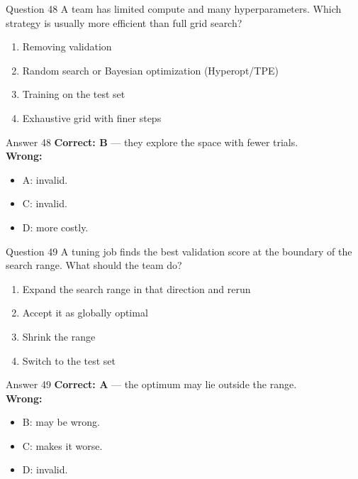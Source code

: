 \documentclass[aspectratio=169,11pt]{beamer}
\begin{document}
\begin{frame}{Question 48}
A team has limited compute and many hyperparameters. Which strategy is usually more efficient than full grid search?
\begin{enumerate}[label=\Alph*.]
\item Removing validation
\item Random search or Bayesian optimization (Hyperopt/TPE)
\item Training on the test set
\item Exhaustive grid with finer steps
\end{enumerate}
\end{frame}
\begin{frame}{Answer 48}
\textbf{Correct: B} --- they explore the space with fewer trials.\\
\vspace{0.5em}
\textbf{Wrong:}
\begin{itemize}
\item A: invalid.
\item C: invalid.
\item D: more costly.
\end{itemize}
\end{frame}

\begin{frame}{Question 49}
A tuning job finds the best validation score at the boundary of the search range. What should the team do?
\begin{enumerate}[label=\Alph*.]
\item Expand the search range in that direction and rerun
\item Accept it as globally optimal
\item Shrink the range
\item Switch to the test set
\end{enumerate}
\end{frame}
\begin{frame}{Answer 49}
\textbf{Correct: A} --- the optimum may lie outside the range.\\
\vspace{0.5em}
\textbf{Wrong:}
\begin{itemize}
\item B: may be wrong.
\item C: makes it worse.
\item D: invalid.
\end{itemize}
\end{frame}
\end{document}
